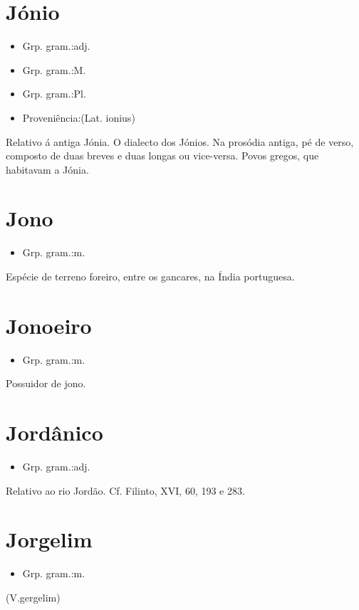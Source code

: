 \documentclass{article}
\begin{document}
\section{Jónio}
\begin{itemize}
\item {Grp. gram.:adj.}
\end{itemize}
\begin{itemize}
\item {Grp. gram.:M.}
\end{itemize}
\begin{itemize}
\item {Grp. gram.:Pl.}
\end{itemize}
\begin{itemize}
\item {Proveniência:(Lat. \textunderscore ionius\textunderscore )}
\end{itemize}
Relativo á antiga Jónia.
O dialecto dos Jónios.
Na prosódia antiga, pé de verso, composto de duas breves e duas longas ou vice-versa.
Povos gregos, que habitavam a Jónia.
\section{Jono}
\begin{itemize}
\item {Grp. gram.:m.}
\end{itemize}
Espécie de terreno foreiro, entre os gancares, na Índia portuguesa.
\section{Jonoeiro}
\begin{itemize}
\item {Grp. gram.:m.}
\end{itemize}
Possuidor de jono.
\section{Jordânico}
\begin{itemize}
\item {Grp. gram.:adj.}
\end{itemize}
Relativo ao rio Jordão. Cf. Filinto, XVI, 60, 193 e 283.
\section{Jorgelim}
\begin{itemize}
\item {Grp. gram.:m.}
\end{itemize}
(V.gergelim)
\end{document}
